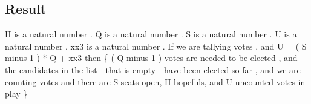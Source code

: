 \subsection{Result}
\begin{texto2}
	H is a natural number . Q is a natural number . S is a natural number . U is a natural number . xx3 is a natural number . If we are tallying votes , and U = ( S minus 1 ) * Q + xx3 then \{ ( Q minus 1 ) votes are needed to be elected , and the candidates in the list - that is empty - have been elected so far , and we are counting votes and there are S seats open, H hopefuls, and U uncounted votes in play \}
\end{texto2}